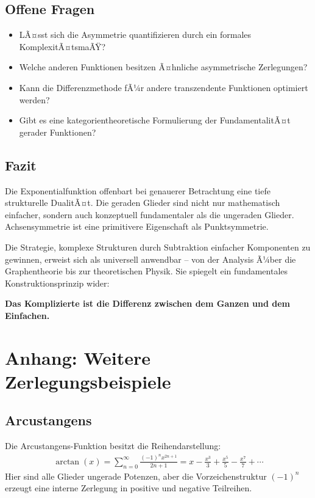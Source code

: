 ﻿\documentclass[a4paper,12pt]{article}
\theoremstyle{definition}
\begin{document}
\subsection{Offene Fragen}

\begin{itemize}
  \item[-] LÃ¤sst sich die Asymmetrie quantifizieren durch ein formales
           KomplexitÃ¤tsmaÃŸ?
  \item[-] Welche anderen Funktionen besitzen Ã¤hnliche asymmetrische
           Zerlegungen?
  \item[-] Kann die Differenzmethode fÃ¼r andere transzendente Funktionen
           optimiert werden?
  \item[-] Gibt es eine kategorientheoretische Formulierung der
           FundamentalitÃ¤t gerader Funktionen?
\end{itemize}

\subsection{Fazit}

Die Exponentialfunktion offenbart bei genauerer Betrachtung eine tiefe
strukturelle DualitÃ¤t. Die geraden Glieder sind nicht nur mathematisch
einfacher, sondern auch konzeptuell fundamentaler als die ungeraden Glieder.
Achsensymmetrie ist eine primitivere Eigenschaft als Punktsymmetrie.

Die Strategie, komplexe Strukturen durch Subtraktion einfacher Komponenten zu
gewinnen, erweist sich als universell anwendbar -- von der Analysis Ã¼ber die
Graphentheorie bis zur theoretischen Physik. Sie spiegelt ein fundamentales
Konstruktionsprinzip wider:

\textbf{Das Komplizierte ist die Differenz zwischen dem Ganzen und dem
Einfachen.}

\section{Anhang: Weitere Zerlegungsbeispiele}

\subsection{Arcustangens}

Die Arcustangens-Funktion besitzt die Reihendarstellung:
\begin{align}
  \arctan(x) = \sum_{n=0}^{\infty} \frac{(-1)^n x^{2n+1}}{2n+1}
             = x - \frac{x^3}{3} + \frac{x^5}{5} - \frac{x^7}{7} + \cdots
\end{align}
Hier sind alle Glieder ungerade Potenzen, aber die Vorzeichenstruktur
$(-1)^n$ erzeugt eine interne Zerlegung in positive und negative Teilreihen.
\end{document}
